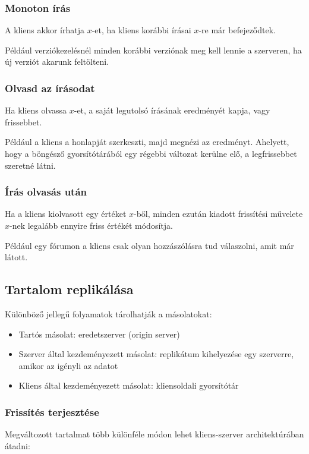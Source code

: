 \documentclass[margin=0px]{article}
\begin{document}
\subsubsection{Monoton írás}

A kliens akkor írhatja $x$-et, ha kliens korábbi írásai $x$-re már befejeződtek.

Például verziókezelésnél minden korábbi verziónak meg kell lennie a szerveren, ha új verziót akarunk feltölteni.

\subsubsection{Olvasd az írásodat}

Ha kliens olvassa $x$-et, a saját legutolsó írásának eredményét kapja, vagy frissebbet.

Például a kliens a honlapját szerkeszti, majd megnézi az eredményt. Ahelyett, hogy a böngésző gyorsítótárából
egy régebbi változat kerülne elő, a legfrissebbet szeretné látni.

\subsubsection{Írás olvasás után}

Ha a kliens kiolvasott egy értéket $x$-ből, minden ezután kiadott frissítési művelete $x$-nek legalább
ennyire friss értékét módosítja.

Például egy fórumon a kliens csak olyan hozzászólásra tud válaszolni, amit már látott.

\subsection{Tartalom replikálása}

Különböző jellegű folyamatok tárolhatják a másolatokat:

\begin{itemize}
    \item	Tartós másolat: eredetszerver (origin server)
    \item	Szerver által kezdeményezett másolat: replikátum kihelyezése egy szerverre, amikor az igényli
          az adatot
    \item	Kliens által kezdeményezett másolat: kliensoldali gyorsítótár
\end{itemize}

\subsubsection{Frissítés terjesztése}
Megváltozott tartalmat több különféle módon lehet kliens-szerver architektúrában átadni:
\end{document}
